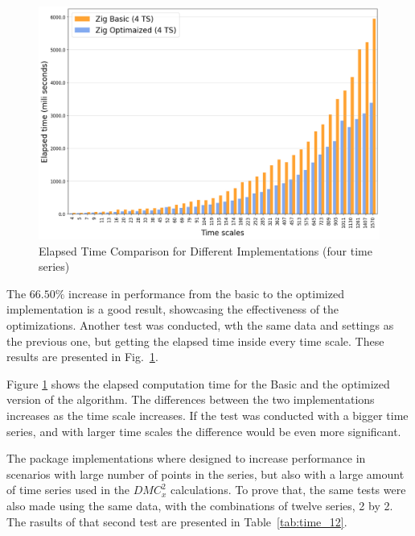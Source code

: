 \documentclass[article]{jss}
\begin{document}
\begin{figure}[h!] 
  \centering
  \includegraphics{
    figs/elapsed_tws_04.png}
  \caption{\label{fig:elapsed_tws_04}Elapsed Time Comparison for Different Implementations (four time series)}
\end{figure}

The $66.50\%$ increase in performance from the basic to the optimized  implementation is a good result, showcasing the effectiveness of the optimizations. Another test was conducted, wth the same data and settings as the previous one, but getting the elapsed time inside every time scale. These results are presented in Fig.~\ref{fig:elapsed_tws_04}.


Figure \ref{fig:elapsed_tws_04} shows the elapsed computation time for the Basic and the optimized version of the algorithm. The differences between the two implementations increases as the time scale increases. If the test was conducted with a bigger time series, and with larger time scales the difference would be even more significant.

The  package implementations where designed to increase performance in scenarios with large number of points in the series, but also with a large amount of time series used in the $DMC_x^2$ calculations. To prove that, the same tests were also made using the same data, with the combinations of twelve series, 2 by 2. The rasults of that second test are presented in Table~\ref{tab:time_12}.
\end{document}
